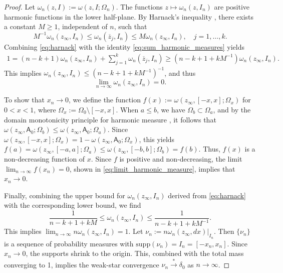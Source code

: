 \documentclass[12pt,oneside,reqno]{amsart}
\theoremstyle{definition}
\numberwithin{equation}{section}
\newcommand{\sfA}{\mathsf{A}}
\begin{document}
\begin{proof}
Let $\omega_n(z, I) := \omega(z, I; \Omega_n)$. The functions $z \mapsto \omega_n(z, I_n)$ are positive harmonic functions in the lower half-plane. By Harnack's inequality \cite[Corollary 1.3.3]{ransford95}, there exists a constant $M \ge 1$, independent of $n$, such that
\begin{equation}
	M^{-1}\omega_n(z_\infty, I_n) \le \omega_n(\overline{z}_j, I_n) \le M\omega_n(z_\infty, I_n), \quad j=1,\dotsc,k.
	\label{eq:harnack}
\end{equation}
Combining \eqref{eq:harnack} with the identity \eqref{eq:sum_harmonic_measures} yields
\begin{align*}
	1 = (n-k+1)\omega_n(z_\infty, I_n) + \sum_{j=1}^{k}\omega_n(\overline{z}_j, I_n) 
	\ge \left(n-k+1 + k M^{-1}\right)\omega_n(z_\infty, I_n).
\end{align*}
This implies $\omega_n(z_\infty, I_n) \le (n-k+1 + kM^{-1})^{-1}$, and thus
\begin{equation} \label{eq:limit_harmonic_measure}
 \lim_{n\to\infty} \omega_n(z_\infty, I_n) = 0.
\end{equation}

To show that $x_n \to 0$, we define the function $f(x) := \omega(z_\infty, [-x, x]; \Omega_x)$ for $0<x<1$, where $\Omega_x := \Omega_0 \setminus [-x, x]$. When $a \leq b$, we have $\Omega_b \subset \Omega_a$, and by the domain monotonicity principle for harmonic measure \cite[Corollary 4.3.9]{ransford95}, it follows that $\omega(z_\infty, \sfA_0; \Omega_b) \le \omega(z_\infty, \sfA_0; \Omega_a)$. Since $\omega(z_\infty, [-x, x]; \Omega_x) = 1 - \omega(z_\infty, \sfA_0; \Omega_x)$, this yields $f(a) = \omega(z_\infty, [-a, a]; \Omega_a) \le \omega(z_\infty, [-b, b]; \Omega_b) = f(b)$. Thus, $f(x)$ is a non-decreasing function of $x$. Since $f$ is positive and non-decreasing, the limit $\lim_{n \to \infty} f(x_n) = 0$, shown in \eqref{eq:limit_harmonic_measure}, implies that $x_n \to 0$.

Finally, combining the upper bound for $\omega_n(z_\infty, I_n)$ derived from \eqref{eq:harnack} with the corresponding lower bound, we find
\[
\frac{1}{n-k+1 + kM} \le \omega_n(z_\infty, I_n) \le \frac{1}{n-k+1 + kM^{-1}}.
\]
This implies $\lim_{n\to\infty} n \omega_n(z_\infty, I_n) = 1$. Let $\nu_n := n \omega_n(z_\infty, dx)|_{I_n}$. Then $\{\nu_n\}$ is a sequence of probability measures with $\mathrm{supp}(\nu_n) = I_n = [-x_n, x_n]$. Since $x_n \to 0$, the supports shrink to the origin. This, combined with the total mass converging to 1, implies the weak-star convergence $\nu_n \xrightarrow{*} \delta_0$ as $n \to \infty$. 
\end{proof}
\end{document}
